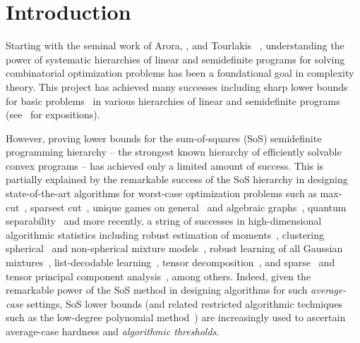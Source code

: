 
\renewcommand{\pE}{\tilde{\mathbb{E}}}



\section{Introduction}

Starting with the seminal work of Arora, \Bollobas, \Lovasz and Tourlakis ~\cite{MR2322869-Arora06}, understanding the power of systematic hierarchies of linear and semidefinite programs for solving combinatorial optimization problems has been a foundational goal in complexity theory. This project has achieved many successes including sharp lower bounds for basic problems~\cite{MR2402454-Schoenebeck07,MR2780074-Charikar09,MR2648454-Raghavendra09,DBLP:conf/ipco/BenabbasM10,DBLP:conf/fsttcs/BenabbasCGM11,DBLP:journals/toc/BenabbasGMT12,DBLP:conf/coco/GhoshT17} in various hierarchies of linear and semidefinite programs~\cite{MR1806434-Lasserre00,parrilo2000structured, MR1061981-Sherali90, DBLP:journals/siamjo/LovaszS91} (see~\cite{MR2894694-Chlamtac12,TCS-086} for expositions).


However, proving lower bounds for the sum-of-squares (SoS) semidefinite programming hierarchy -- the strongest known hierarchy of efficiently solvable convex programs -- has achieved only a limited amount of success.  This is partially explained by the remarkable success of the SoS hierarchy in designing state-of-the-art algorithms for worst-case optimization problems such as max-cut~\cite{MR1412228-Goemans95}, sparsest cut~\cite{MR2535878-Arora09}, unique games on general~\cite{MR3424199-Arora15} and algebraic graphs~\cite{DBLP:journals/corr/abs-2006-09969,DBLP:journals/corr/abs-2011-04658},  quantum separability~\cite{DBLP:conf/stoc/BarakKS17} and more recently, a string of successes in high-dimensional algorithmic statistics including robust estimation of moments~\cite{DBLP:journals/corr/abs-1711-11581}, clustering spherical~\cite{HopkinsLi17,KothariSteinhardt17} and non-spherical mixture models~\cite{bakshi2020outlierrobust, DHKK20}, robust learning of all Gaussian mixtures~\cite{DBLP:journals/corr/abs-2012-02119, DBLP:journals/corr/abs-2011-03622}, list-decodable learning~\cite{DBLP:journals/corr/abs-1905-05679,DBLP:journals/corr/abs-1905-04660,DBLP:journals/corr/abs-2002-05139,raghavendra2020list}, tensor decomposition~\cite{DBLP:conf/focs/MaSS16}, and sparse~\cite{DBLP:conf/focs/dOrsiKNS20} and tensor principal component analysis~\cite{DBLP:conf/colt/HopkinsSS15}, among others. Indeed, given the remarkable power of the SoS method in designing algorithms for such \emph{average-case} settings, SoS lower bounds (and related restricted algorithmic techniques such as the low-degree polynomial method~\cite{8104104,DBLP:conf/focs/HopkinsS17,DBLP:journals/corr/abs-1907-11636}) are increasingly used to ascertain average-case hardness and \emph{algorithmic thresholds}. 

